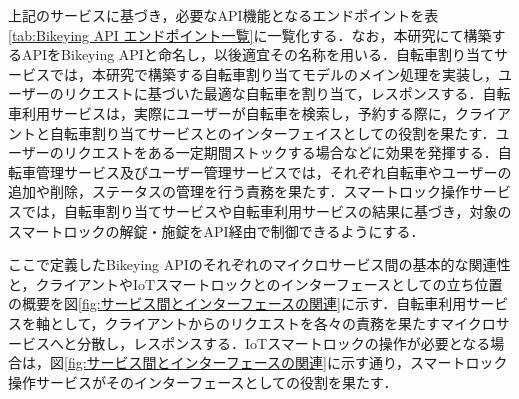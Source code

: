           \par 上記のサービスに基づき，必要なAPI機能となるエンドポイントを表\ref{tab:Bikeying API エンドポイント一覧}に一覧化する．なお，本研究にて構築するAPIをBikeying APIと命名し，以後適宜その名称を用いる．自転車割り当てサービスでは，本研究で構築する自転車割り当てモデルのメイン処理を実装し，ユーザーのリクエストに基づいた最適な自転車を割り当て，レスポンスする．自転車利用サービスは，実際にユーザーが自転車を検索し，予約する際に，クライアントと自転車割り当てサービスとのインターフェイスとしての役割を果たす．ユーザーのリクエストをある一定期間ストックする場合などに効果を発揮する．自転車管理サービス及びユーザー管理サービスでは，それぞれ自転車やユーザーの追加や削除，ステータスの管理を行う責務を果たす．スマートロック操作サービスでは，自転車割り当てサービスや自転車利用サービスの結果に基づき，対象のスマートロックの解錠・施錠をAPI経由で制御できるようにする．
          \par ここで定義したBikeying APIのそれぞれのマイクロサービス間の基本的な関連性と，クライアントやIoTスマートロックとのインターフェースとしての立ち位置の概要を図\ref{fig:サービス間とインターフェースの関連}に示す．自転車利用サービスを軸として，クライアントからのリクエストを各々の責務を果たすマイクロサービスへと分散し，レスポンスする．IoTスマートロックの操作が必要となる場合は，図\ref{fig:サービス間とインターフェースの関連}に示す通り，スマートロック操作サービスがそのインターフェースとしての役割を果たす．

